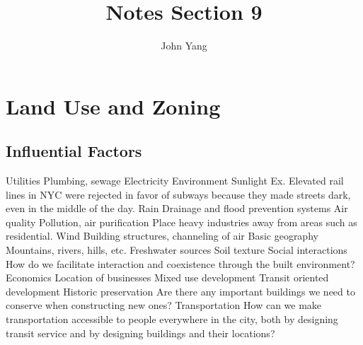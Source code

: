 \documentclass{article}
\title{Notes Section 9} %
\author{John Yang}
\begin{document}
    \maketitle
    \tableofcontents
    \section{Land Use and Zoning}
    \subsection{Influential Factors}
    \begin{outline}
        \1 Utilities
            \2 Plumbing, sewage
            \2 Electricity
        \1 Environment
            \2 Sunlight
                \3 Ex. Elevated rail lines in NYC were rejected in favor of subways because they made streets dark, even in the middle of the day. 
            \2 Rain 
                \3 Drainage and flood prevention systems
            \2 Air quality
                \3 Pollution, air purification
                \3 Place heavy industries away from areas such as residential. 
            \2 Wind
                \3 Building structures, channeling of air
        \1 Basic geography
            \2 Mountains, rivers, hills, etc. 
            \2 Freshwater sources
            \2 Soil texture
        \1 Social interactions
            \2 How do we facilitate interaction and coexistence through the built environment?
        \1 Economics
            \2 Location of businesses 
            \2 Mixed use development
            \2 Transit oriented development
        \1 Historic preservation
            \2 Are there any important buildings we need to conserve when constructing new ones?
        \1 Transportation
            \2 How can we make transportation accessible to people everywhere in the city, both by designing transit service and by designing buildings and their locations?

    \end{outline}
\end{document}

